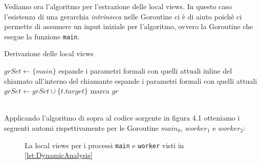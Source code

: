 Vediamo ora l'algoritmo per l'estrazione delle local views. In questo caso l'esistenza di una gerarchia \emph{intrinseca} nelle Goroutine ci è di aiuto poichè ci permette di assumere un input iniziale per l'algoritmo, ovvero la Goroutine che esegue la funzione \texttt{main}.
\begin{algorithm}
    \caption{Derivazione delle local views}
    \begin{algorithmic}
        \State $grSet \gets \{ main \}$
         
         
        \State espande i parametri formali con quelli attuali
        \State inline del chiamato all'interno del chiamante
        \State espande i parametri formali con quelli attuali
        \State $grSet \gets grSet \cup \{ t.target \}$
        \EndIf
        \EndFor
        \State marca $gr$
        \EndWhile
    \end{algorithmic}
\end{algorithm}\\
Applicando l'algoritmo di sopra al codice sorgente in figura 4.1 otteniamo i seguenti automi rispettivamente per le Goroutine $main_0$, $worker_1$ e $worker_2$:
\begin{figure}[ht]
    \centering
    \caption{La local views per i processi \texttt{main} e \texttt{worker} visti in \ref{lst:DynamicAnalysis}}
\end{figure}
\newpage %


